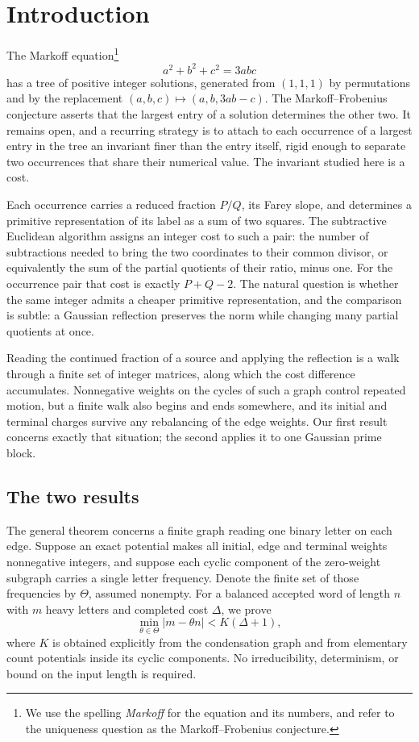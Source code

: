 \section{Introduction}
\label{sec:introduction}

The Markoff equation\footnote{We use the spelling \emph{Markoff} for the
equation and its numbers, and refer to the uniqueness question as the
Markoff--Frobenius conjecture.}
$$
 a^2+b^2+c^2=3abc
$$
has a tree of positive integer solutions, generated from $(1,1,1)$ by
permutations and by the replacement $(a,b,c)\mapsto(a,b,3ab-c)$. The
Markoff--Frobenius conjecture asserts that the largest entry of a solution
determines the other two. It remains open, and a recurring strategy is to
attach to each occurrence of a largest entry in the tree an invariant finer
than the entry itself, rigid enough to separate two occurrences that share
their numerical value. The invariant studied here is a cost.

Each occurrence carries a reduced fraction $P/Q$, its Farey slope, and
determines a primitive representation of its label as a sum of two squares.
The subtractive Euclidean algorithm assigns an integer cost to such a pair:
the number of subtractions needed to bring the two coordinates to their
common divisor, or equivalently the sum of the partial quotients of their
ratio, minus one. For the occurrence pair that cost is exactly $P+Q-2$.
The natural question is whether the same integer admits a cheaper primitive
representation, and the comparison is subtle: a Gaussian reflection
preserves the norm while changing many partial quotients at once.

Reading the continued fraction of a source and applying the reflection is a
walk through a finite set of integer matrices, along which the cost
difference accumulates. Nonnegative weights on the cycles of such a graph
control repeated motion, but a finite walk also begins and ends somewhere,
and its initial and terminal charges survive any rebalancing of the edge
weights. Our first result concerns exactly that situation; the second
applies it to one Gaussian prime block.

\subsection{The two results}

The general theorem concerns a finite graph reading one binary letter on
each edge. Suppose an exact potential makes all initial, edge and terminal
weights nonnegative integers, and suppose each cyclic component of the
zero-weight subgraph carries a single letter frequency. Denote the finite
set of those frequencies by $\Theta$, assumed nonempty. For a balanced
accepted word of length $n$ with $m$ heavy letters and completed cost
$\Delta$, we prove
\begin{equation}
 \min_{\theta\in\Theta}|m-\theta n|<K(\Delta+1),
 \label{eq:intro-stability}
\end{equation}
where $K$ is obtained explicitly from the condensation graph and from
elementary count potentials inside its cyclic components. No
irreducibility, determinism, or bound on the input length is required.

